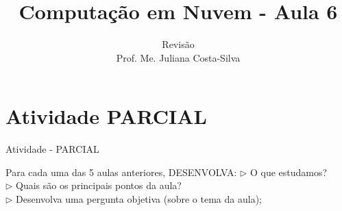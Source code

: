 \documentclass{beamer}
\title{Computação em Nuvem - Aula 6}
\subtitle{Revisão\\
Prof. Me. Juliana Costa-Silva}
\begin{document}
\frame{
 \titlepage
}

\section{Atividade PARCIAL}
\begin{frame}{Atividade - PARCIAL}
    
    Para cada uma das 5 aulas anteriores, DESENVOLVA:
    $\rhd$ O que estudamos? \\
    \vspace{0.5cm}
    $\rhd$ Quais são os principais pontos da aula? \\
    \vspace{0.5cm}
    $\rhd$ Desenvolva uma pergunta objetiva (sobre o tema da aula);\\
    
\end{frame}

\end{document}
